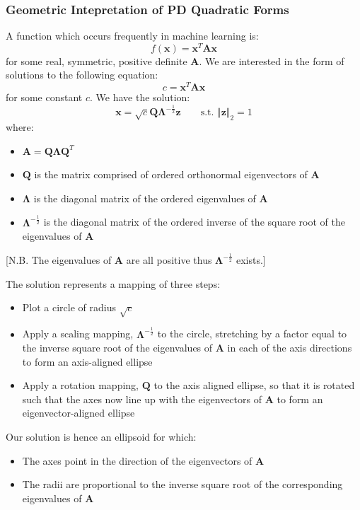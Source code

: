 \subsubsection{Geometric Intepretation of PD Quadratic Forms}
A function which occurs frequently in machine learning is:
\[f(\mathbf{x}) = \mathbf{x}^T \mathbf{A} \mathbf{x}\]
for some real, symmetric, positive definite $\mathbf{A}$. We are interested in
the form of solutions to the following equation:
\[c = \mathbf{x}^T \mathbf{A} \mathbf{x}\]
for some constant $c$. We have the solution:
\[\mathbf{x} = \sqrt{c} \mathbf{Q} \boldsymbol{\Lambda}^{-\frac{1}{2}}\mathbf{z} \qquad \mbox{s.t. } \Vert\mathbf{z}\Vert_2 =1\]
where:
\begin{itemize}
  \item $\mathbf{A} = \mathbf{Q} \boldsymbol{\Lambda} \mathbf{Q}^T$
  \item $\mathbf{Q}$ is the matrix comprised of ordered orthonormal eigenvectors of $\mathbf{A}$
  \item $\boldsymbol{\Lambda}$ is the diagonal matrix of the ordered eigenvalues of $\mathbf{A}$
  \item $\boldsymbol{\Lambda}^{-\frac{1}{2}}$ is the diagonal matrix of the ordered inverse of the square root of the eigenvalues of $\mathbf{A}$
\end{itemize}
[N.B. The eigenvalues of $\mathbf{A}$ are all positive thus
$\boldsymbol{\Lambda}^{-\frac{1}{2}}$ exists.]

The solution represents a mapping of three steps:
\begin{itemize}
  \item Plot a circle of radius $\sqrt{c}$
  \item Apply a scaling mapping, $\boldsymbol{\Lambda}^{-\frac{1}{2}}$ to the
    circle, stretching by a factor equal to the inverse square root of the
    eigenvalues of $\mathbf{A}$ in each of the axis directions to form an
    axis-aligned ellipse
  \item Apply a rotation mapping, $\mathbf{Q}$ to the axis aligned ellipse, so
    that it is rotated such that the axes now line up with the eigenvectors of
    $\mathbf{A}$ to form an eigenvector-aligned ellipse
\end{itemize}
Our solution is hence an ellipsoid for which:
\begin{itemize}
  \item The axes point in the direction of the eigenvectors of $\mathbf{A}$
  \item The radii are proportional to the inverse square root of the corresponding eigenvalues of $\mathbf{A}$
\end{itemize}
